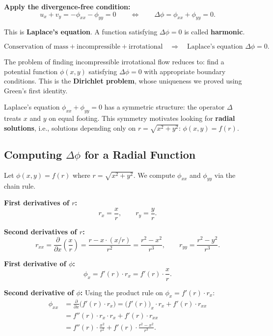 \documentclass[11pt]{report}
\newcommand{\parti}[2]{\frac{\partial #1}{\partial #2}}
\begin{document}
\textbf{Apply the divergence-free condition:}
\[
u_x + v_y = -\phi_{xx} - \phi_{yy} = 0 \qquad \Longleftrightarrow \qquad \boxed{\Delta \phi = \phi_{xx} + \phi_{yy} = 0.}
\]

This is \textbf{Laplace's equation}. A function satisfying $\Delta \phi = 0$ is called \textbf{harmonic}.

\begin{remark}
\[
\text{Conservation of mass} + \text{incompressible} + \text{irrotational} \quad \Longrightarrow \quad \text{Laplace's equation } \Delta \phi = 0.
\]

The problem of finding incompressible irrotational flow reduces to: find a potential function $\phi(x,y)$ satisfying $\Delta \phi = 0$ with appropriate boundary conditions. This is the \textbf{Dirichlet problem}, whose uniqueness we proved using Green's first identity.
\end{remark}

\begin{remark}
Laplace's equation $\phi_{xx} + \phi_{yy} = 0$ has a symmetric structure: the operator $\Delta$ treats $x$ and $y$ on equal footing. This symmetry motivates looking for \textbf{radial solutions}, i.e., solutions depending only on $r = \sqrt{x^2 + y^2}$: $\phi(x,y) = f(r)$.
\end{remark}

\subsection*{Computing $\Delta \phi$ for a Radial Function}

Let $\phi(x,y) = f(r)$ where $r = \sqrt{x^2 + y^2}$. We compute $\phi_{xx}$ and $\phi_{yy}$ via the chain rule.

\textbf{First derivatives of $r$:}
\[
r_x = \frac{x}{r}, \qquad r_y = \frac{y}{r}.
\]

\textbf{Second derivatives of $r$:}
\[
r_{xx} = \parti{}{x}\left(\frac{x}{r}\right) = \frac{r - x \cdot (x/r)}{r^2} = \frac{r^2 - x^2}{r^3}, \qquad r_{yy} = \frac{r^2 - y^2}{r^3}.
\]

\textbf{First derivative of $\phi$:}
\[
\phi_x = f'(r) \cdot r_x = f'(r) \cdot \frac{x}{r}.
\]

\textbf{Second derivative of $\phi$:} Using the product rule on $\phi_x = f'(r) \cdot r_x$:
\begin{align*}
\phi_{xx} &= \parti{}{x}\big(f'(r) \cdot r_x\big) = \big(f'(r)\big)_x \cdot r_x + f'(r) \cdot r_{xx} \\
&= f''(r) \cdot r_x \cdot r_x + f'(r) \cdot r_{xx} \\
&= f''(r) \cdot \frac{x^2}{r^2} + f'(r) \cdot \frac{r^2 - x^2}{r^3}.
\end{align*}
\end{document}
